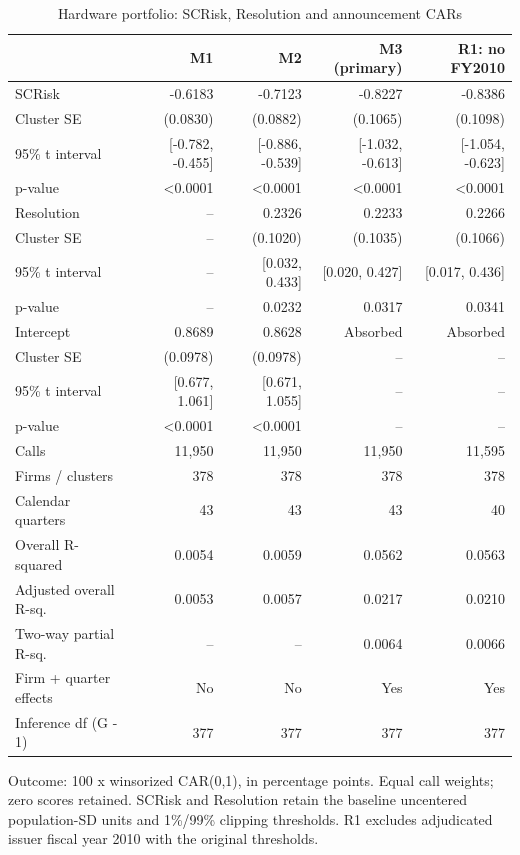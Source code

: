 \documentclass[10pt]{article}
\begin{document}
\begin{table}[htbp]\centering
\caption{Hardware portfolio: SCRisk, Resolution and announcement CARs}
\small\begin{tabular}{lrrrr}\toprule
 & M1 & M2 & M3 (primary) & R1: no FY2010 \\
\midrule
SCRisk & -0.6183 & -0.7123 & -0.8227 & -0.8386 \\
Cluster SE & (0.0830) & (0.0882) & (0.1065) & (0.1098) \\
95\% t interval & [-0.782, -0.455] & [-0.886, -0.539] & [-1.032, -0.613] & [-1.054, -0.623] \\
p-value & <0.0001 & <0.0001 & <0.0001 & <0.0001 \\
Resolution & -- & 0.2326 & 0.2233 & 0.2266 \\
Cluster SE & -- & (0.1020) & (0.1035) & (0.1066) \\
95\% t interval & -- & [0.032, 0.433] & [0.020, 0.427] & [0.017, 0.436] \\
p-value & -- & 0.0232 & 0.0317 & 0.0341 \\
Intercept & 0.8689 & 0.8628 & Absorbed & Absorbed \\
Cluster SE & (0.0978) & (0.0978) & -- & -- \\
95\% t interval & [0.677, 1.061] & [0.671, 1.055] & -- & -- \\
p-value & <0.0001 & <0.0001 & -- & -- \\
\midrule
Calls & 11,950 & 11,950 & 11,950 & 11,595 \\
Firms / clusters & 378 & 378 & 378 & 378 \\
Calendar quarters & 43 & 43 & 43 & 40 \\
Overall R-squared & 0.0054 & 0.0059 & 0.0562 & 0.0563 \\
Adjusted overall R-sq. & 0.0053 & 0.0057 & 0.0217 & 0.0210 \\
Two-way partial R-sq. & -- & -- & 0.0064 & 0.0066 \\
Firm + quarter effects & No & No & Yes & Yes \\
Inference df (G - 1) & 377 & 377 & 377 & 377 \\
\bottomrule\end{tabular}
\end{table}
\footnotesize
Outcome: 100 x winsorized CAR(0,1), in percentage points. Equal call weights; zero scores retained. SCRisk and Resolution retain the baseline uncentered population-SD units and 1\%/99\% clipping thresholds. R1 excludes adjudicated issuer fiscal year 2010 with the original thresholds.
\end{document}

